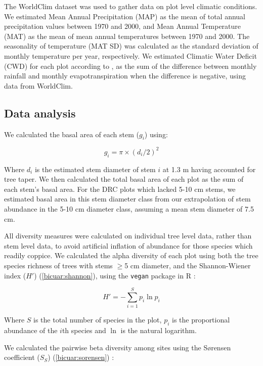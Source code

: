 \begin{refsection}
The WorldClim dataset \citep{Fick2017} was used to gather data on plot level climatic conditions. We estimated Mean Annual Precipitation (MAP) as the mean of total annual precipitation values between 1970 and 2000, and Mean Annual Temperature (MAT) as the mean of mean annual temperatures between 1970 and 2000. The seasonality of temperature (MAT SD) was calculated as the standard deviation of monthly temperature per year, respectively. We estimated Climatic Water Deficit (CWD) for each plot according to \citet{Chave2014}, as the sum of the difference between monthly rainfall and monthly evapotranspiration when the difference is negative, using data from WorldClim.

\subsection{Data analysis}
\label{bicuar:ssec:data_analysis}

We calculated the basal area of each stem ($g_{i}$) using:

\begin{equation}
	g_{i} = \pi{} \times (d_{i} / 2)^{2}
\end{equation}

Where $d_{i}$ is the estimated stem diameter of stem $i$ at 1.3 m having accounted for tree taper. We then calculated the total basal area of each plot as the sum of each stem's basal area. For the DRC plots which lacked 5-10 cm stems, we estimated basal area in this stem diameter class from our extrapolation of stem abundance in the 5-10 cm diameter class, assuming a mean stem diameter of 7.5 cm.

All diversity measures were calculated on individual tree level data, rather than stem level data, to avoid artificial inflation of abundance for those species which readily coppice. We calculated the alpha diversity of each plot using both the tree species richness of trees with stems $\ge$5 cm diameter, and the Shannon-Wiener index ($H'$) (\autoref{bicuar:shannon}), using the \texttt{vegan} package in R \citep{vegan}:

\begin{equation}
	H' = -\sum^{S}_{i=1} p_{i} \ln{p_{i}}
	\label{bicuar:shannon}
\end{equation}

Where $S$ is the total number of species in the plot, $p_{i}$ is the proportional abundance of the $i$th species and $\ln$ is the natural logarithm.

We calculated the pairwise beta diversity among sites using the S\o{}rensen coefficient ($S_{S}$) (\autoref{bicuar:sorensen}) \citep{Koleff2003}:


\end{refsection}
